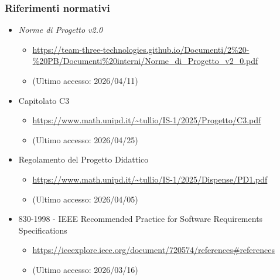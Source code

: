 \documentclass[a4paper,12pt]{article}
\begin{document}
{{            \subsubsection{Riferimenti normativi} {
                \begin{itemize}
                    \item \textit{Norme di Progetto v2.0}
                    \begin{itemize}
                        \item \url{https://team-three-technologies.github.io/Documenti/2%20-%20PB/Documenti%20interni/Norme_di_Progetto_v2_0.pdf}
                        \item[] (Ultimo accesso: 2026/04/11)
                    \end{itemize}
                    \item Capitolato C3
                    \begin{itemize}
                        \item {\url{https://www.math.unipd.it/~tullio/IS-1/2025/Progetto/C3.pdf}}
                        \item[] (Ultimo accesso: 2026/04/25)
                    \end{itemize}
                    \item Regolamento del Progetto Didattico
                    \begin{itemize}
                        \item \url{https://www.math.unipd.it/~tullio/IS-1/2025/Dispense/PD1.pdf}
                        \item[] (Ultimo accesso: 2026/04/05)
                    \end{itemize}
                    \item 830-1998 - IEEE Recommended Practice for Software Requirements Specifications
                    \begin{itemize}
                        \item \url{https://ieeexplore.ieee.org/document/720574/references#references}
                        \item[] (Ultimo accesso: 2026/03/16)
                    \end{itemize}
                \end{itemize}
            }
}}
\end{document}
